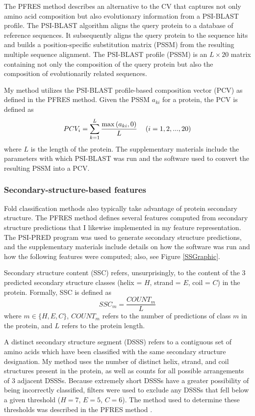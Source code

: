 \documentclass{bioinfo}
\begin{document}
The PFRES method \citep{Chen} describes an alternative to the CV that captures not only amino acid composition but also evolutionary information from a PSI-BLAST profile.
The PSI-BLAST algorithm aligns the query protein to a database of reference sequences.
It subsequently aligns the query protein to the sequence hits and builds a position-specific substitution matrix (PSSM) from the resulting multiple sequence alignment.
The PSI-BLAST profile (PSSM) is an $L \times 20$ matrix containing not only the composition of the query protein but also the composition of evolutionarily related sequences.

My method utilizes the PSI-BLAST profile-based composition vector (PCV) as defined in the PFRES method.
Given the PSSM $a_{ki}$ for a protein, the PCV is defined as
\[ PCV_i = \sum_{k=1}^{L}\frac{\max{(a_{ki},0})}{L} \hspace{12px} (i=1,2,...,20) \]
where $L$ is the length of the protein.
The supplementary materials include the parameters with which PSI-BLAST was run and the software used to convert the resulting PSSM into a PCV.

\subsubsection*{Secondary-structure-based features}
Fold classification methods also typically take advantage of protein secondary structure.
The PFRES method defines several features computed from secondary structure predictions that I likewise implemented in my feature representation.
The PSI-PRED program \citep{Jones} was used to generate secondary structure predictions, and the supplementary materials include details on how the software was run and how the following features were computed; also, see Figure \ref{SSGraphic}.

Secondary structure content (SSC) refers, unsurprisingly, to the content of the 3 predicted secondary structure classes (helix = $H$, strand = $E$, coil = $C$) in the protein.
Formally, SSC is defined as
\[ SSC_m = \frac{COUNT_m}{L} \]
where $m \in \{H, E, C\}$, $COUNT_m$ refers to the number of predictions of class $m$ in the protein, and $L$ refers to the protein length.

A distinct secondary structure segment (DSSS) refers to a contiguous set of amino acids which have been classified with the same secondary structure designation.
My method uses the number of distinct helix, strand, and coil structures present in the protein, as well as counts for all possible arrangements of 3 adjacent DSSSs.
Because extremely short DSSSs have a greater possibility of being incorrectly classified, filters were used to exclude any DSSSs that fell below a given threshold ($H=7$, $E=5$, $C=6$).
The method used to determine these thresholds was described in the PFRES method \citep{Chen}.
\end{document}
